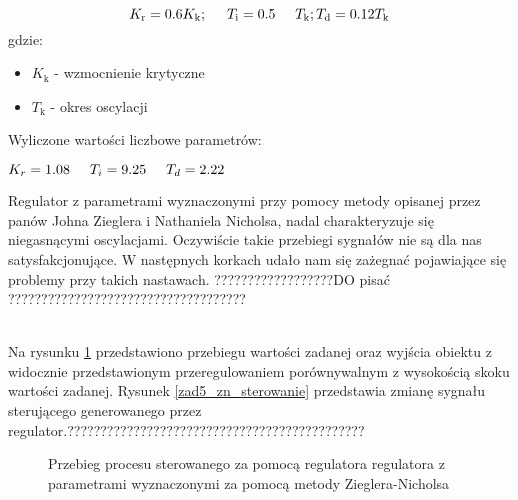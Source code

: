 \begin{equation}
\label{zad5_zn_wzory}
K_{\mathrm{r}}=\num{0,6}K_{\mathrm{k}}; \hspace{0.5 cm} T_{\mathrm{i}}=\num{0,5} \hspace{0.5 cm} T_{\mathrm{k}}; T_{\mathrm{d}}=\num{0,12} T_{\mathrm{k}}
\end{equation}
gdzie:
\begin{center}
\begin{itemize}
    \item $K_{\mathrm{k}}$ - wzmocnienie krytyczne
    \item $T_{\mathrm{k}}$ - okres oscylacji
\end{itemize}
\end{center}

Wyliczone wartości liczbowe parametrów:
\begin{center}
$K_{r}=\num{1,08} \hspace{0.5 cm}
T_{i}=\num{9,25}   \hspace{0.5 cm}
T_{d}=\num{2,22}$
\end{center}

Regulator z parametrami wyznaczonymi przy pomocy metody opisanej przez panów Johna Zieglera i Nathaniela Nicholsa, nadal charakteryzuje się niegasnącymi oscylacjami. Oczywiście takie przebiegi sygnałów nie są dla nas satysfakcjonujące. W następnych korkach udało nam się zażegnać pojawiające się problemy przy takich nastawach. ??????????????????DO pisać ????????????????????????????????????

~\\Na rysunku \ref{zad5_zn_regulator} przedstawiono przebiegu wartości zadanej oraz
wyjścia obiektu z widocznie przedstawionym przeregulowaniem porównywalnym z wysokością 
skoku wartości zadanej. Rysunek \ref{zad5_zn_sterowanie} przedstawia zmianę sygnału sterującego
generowanego przez regulator.?????????????????????????????????????????????
\begin{figure}[b]
    \centering
    \caption{Przebieg procesu sterowanego za pomocą regulatora regulatora z parametrami wyznaczonymi za pomocą metody Zieglera-Nicholsa}
    \label{zad5_zn_regulator}
\end{figure}

